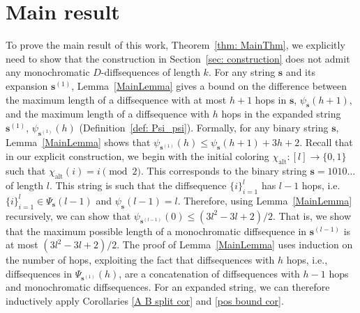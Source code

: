 \documentclass[11pt]{article}
\def\mod{\!\pmod}
\begin{document}




\section{Main result}\label{MainResult}
To prove the main result of this work, Theorem~\ref{thm: MainThm}, we explicitly need to show that the construction in Section~\ref{sec: construction} does not admit any monochromatic $D$-diffsequences of length $k$. For any string $\mathbf{s}$ and its expansion $\mathbf{s}^{(1)}$, Lemma~\ref{MainLemma} gives a bound on the difference between the maximum length of a diffsequence with at most $h+1$ hops in $\mathbf{s}$, $\psi_{\mathbf{s}}(h+1)$, and the
maximum length of a diffsequence with $h$ hops in the expanded string $\mathbf{s}^{(1)}$, $\psi_{\mathbf{s}^{(1)}}(h)$ (Definition~\ref{def: Psi_psi}). Formally, for any binary string $\mathbf{s}$, Lemma~\ref{MainLemma} shows that $\psi_{\mathbf{s}^{(1)}}(h) \le \psi_{\mathbf{s}}(h+1) + 3h + 2$. Recall that in our explicit construction, we begin with the initial coloring $\chi_{\text{alt}} \colon [l] \to \{0,1\}$ such that $\chi_\text{alt}(i) = i \mod{2}$. This corresponds to the binary string $\mathbf{s} = 1010 \ldots$ of length $l$. This string is such that the diffsequence $\{i\}_{i=1}^{l}$ has $l-1$ hops, i.e. $\{i\}_{i=1}^{l} \in \Psi_{\mathbf{s}}(l-1)$ and $\psi_{\mathbf{s}}(l-1) = l$. Therefore, using Lemma~\ref{MainLemma} recursively, we can show that $\psi_{\mathbf{s}^{(l-1)}}(0) \le (3l^2-3l+2)/2$. That is, we show that the maximum possible length of a monochromatic diffsequence in $\mathbf{s}^{(l-1)}$ is at most $(3l^2-3l+2)/2$. The proof of Lemma~\ref{MainLemma} uses induction on the number of hops, exploiting the fact that diffsequences with $h$ hops, i.e., diffsequences in $\Psi_{\mathbf{s}^{(1)}}(h)$, are a concatenation of diffsequences with $h-1$ hops and monochromatic diffsequences. For an expanded string, we can therefore inductively apply Corollaries \ref{A B split cor} and \ref{pos bound cor}.

\end{document}

